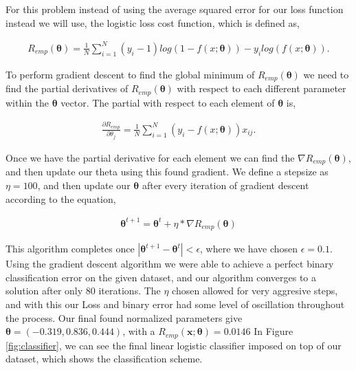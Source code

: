 \documentclass[paper=a4, fontsize=11pt]{scrartcl} %
\begin{document}
For this problem instead of using the average squared error for our loss function instead we will use, the logistic loss cost function, which is defined as, 

\begin{align}
R_{emp}(\bm{\theta}) = \frac{1}{N}\sum\limits_{i=1}^N(y_{i}-1)log(1-f(x;\bm{\theta})) - y_{i}log(f(x;\bm{\theta})).
\end{align}

To perform gradient descent to find the global minimum of $R_{emp}(\bm{\theta})$ we need to find the partial derivatives of $R_{emp}(\bm{\theta})$ with respect to each different parameter within the $\bm{\theta}$ vector.  The partial with respect to each element of $\bm{\theta}$ is,

\begin{align}
\frac{\partial R_{emp}}{\partial \theta_{j}} = \frac{1}{N}\sum\limits_{i=1}^N(y_{i}-f(x;\bm{\theta}))x_{ij}.
\end{align}

Once we have the partial derivative for each element we can find the $\nabla R_{emp}(\bm{\theta})$, and then update our theta using this found gradient. 
We define a stepsize as $\eta = 100$, and then update our $\bm{\theta}$ after every iteration of gradient descent according to the equation,

\begin{align}
\bm{\theta} ^{t+1} = \bm{\theta} ^t + \eta*\nabla R_{emp}(\bm{\theta})
\end{align}

This algorithm completes once $| \bm{\theta} ^{t+1} -  \bm{\theta} ^t| < \epsilon$, where we have chosen $\epsilon = 0.1$. 
Using the gradient descent algorithm we were able to achieve a perfect binary classification error on the given dataset, and our algorithm converges to a solution after only 80 iterations.
The $\eta$ chosen allowed for very aggresive steps, and with this our Loss and binary error had some level of oscillation throughout the process.
Our final found normalized parameters give $\bm{\theta}  = (-0.319, 0.836, 0.444)$, with a $R_{emp}(\bm{x};\bm{\theta}) = 0.0146$ 
In Figure \ref{fig:classifier}, we can see the  final linear logistic classifier imposed on top of our dataset, which shows the classification scheme.
\end{document}
